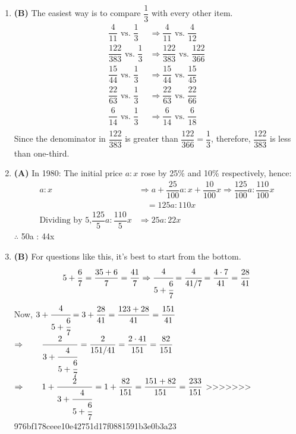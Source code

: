 \begin{multicols}{2}
\begin{enumerate}[label={\textbf{\arabic*.}}]
\begin{enumerate}[label={\arabic*.}]
    \item \textbf{(B)} The easiest way is to compare \(\dfrac{1}{3}\) with every other item.
    \begin{align*}
    \dfrac{4}{11} \text{ vs. } \dfrac{1}{3} &\Rightarrow \dfrac{4}{11} \text{ vs. } \dfrac{4}{12} \\
    \dfrac{122}{383} \text{ vs. } \dfrac{1}{3} &\Rightarrow \dfrac{122}{383} \text{ vs. } \dfrac{122}{366} \\
    \dfrac{15}{44} \text{ vs. } \dfrac{1}{3} &\Rightarrow \dfrac{15}{44} \text{ vs. } \dfrac{15}{45} \\
    \dfrac{22}{63} \text{ vs. } \dfrac{1}{3} &\Rightarrow \dfrac{22}{63} \text{ vs. } \dfrac{22}{66} \\
    \dfrac{6}{14} \text{ vs. } \dfrac{1}{3} &\Rightarrow \dfrac{6}{14} \text{ vs. } \dfrac{6}{18} \\
    \end{align*}
    Since the denominator in \(\dfrac{122}{383}\) is greater than \(\dfrac{122}{366} = \dfrac{1}{3}\), therefore, \(\dfrac{122}{383}\) is less than one-third.
    
    \item \textbf{(A)} In 1980: The initial price \(a : x\) rose by 25\% and 10\% respectively, hence:
    \begin{align*}
    a:x &\Rightarrow a + \dfrac{25}{100}a : x + \dfrac{10}{100}x \Rightarrow \dfrac{125}{100}a : \dfrac{110}{100}x \\
    &\quad = 125a : 110x \\
    \text{Dividing by 5,} \dfrac{125}{5} a : \dfrac{110}{5} x &\Rightarrow 25a : 22x
    \end{align*}
    \(\therefore\)  \hspace{20px} 50a : 44x
    
    \item \textbf{(B)} For questions like this, it's best to start from the bottom.
    \[5 + \dfrac{6}{7} = \dfrac{35 + 6}{7} = \dfrac{41}{7} \Rightarrow \cfrac{4}{5 + \cfrac{6}{7}} = \cfrac{4}{41/7} = \dfrac{4 \cdot 7}{41} = \dfrac{28}{41}\]
    Now, \(3 + \cfrac{4}{5 + \cfrac{6}{7}} = 3 + \dfrac{28}{41} = \dfrac{123 + 28}{41} = \dfrac{151}{41}\)
    \vspace{10pt}
    \(\Rightarrow \hspace{20px} \dfrac{2}{3 + \cfrac{4}{5 + \cfrac{6}{7}}} = \dfrac{2}{151/41} = \dfrac{2 \cdot 41}{151} = \dfrac{82}{151}\)
    \vspace{10pt}
    \(\Rightarrow \hspace{20px} 1 + \dfrac{2}{3 + \cfrac{4}{5 + \cfrac{6}{7}}} = 1 + \dfrac{82}{151} = \dfrac{151 + 82}{151} = \dfrac{233}{151}\)
>>>>>>> 976bf178ceee10e42751d17f0881591b3e0b3a23
    

\end{enumerate}
\end{enumerate}
\end{multicols}
